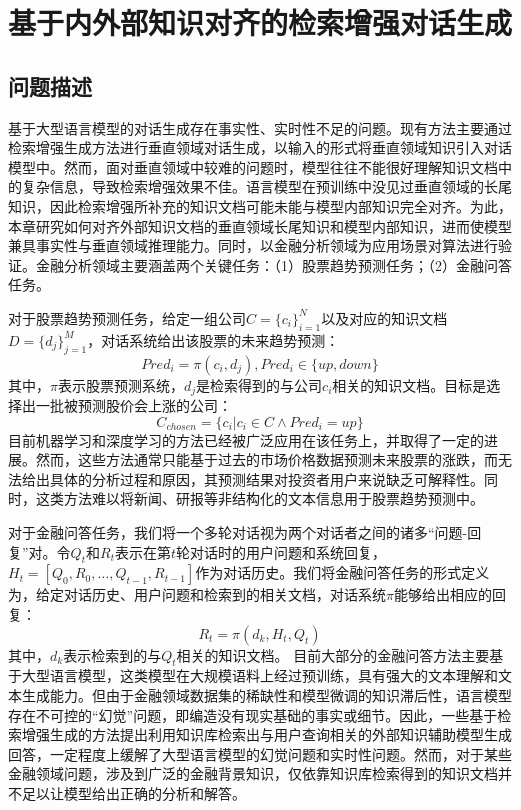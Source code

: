 \chapter{基于内外部知识对齐的检索增强对话生成}

\section{问题描述}

基于大型语言模型的对话生成存在事实性、实时性不足的问题。现有方法主要通过检索增强生成方法进行垂直领域对话生成，以输入的形式将垂直领域知识引入对话模型中。然而，面对垂直领域中较难的问题时，模型往往不能很好理解知识文档中的复杂信息，导致检索增强效果不佳。语言模型在预训练中没见过垂直领域的长尾知识，因此检索增强所补充的知识文档可能未能与模型内部知识完全对齐。为此，本章研究如何对齐外部知识文档的垂直领域长尾知识和模型内部知识，进而使模型兼具事实性与垂直领域推理能力。同时，以金融分析领域为应用场景对算法进行验证。金融分析领域主要涵盖两个关键任务：（1）股票趋势预测任务；（2）金融问答任务。

对于股票趋势预测任务，给定一组公司$C=\{c_i\}_{i=1}^N$以及对应的知识文档$D=\{d_j\}_{j=1}^M$，对话系统给出该股票的未来趋势预测：
\begin{equation}
	Pred_i=\pi(c_i, d_j), Pred_i \in \{up, down\}
\end{equation}
其中，$\pi$表示股票预测系统，$d_j$是检索得到的与公司$c_i$相关的知识文档。目标是选择出一批被预测股价会上涨的公司：
\begin{equation}
	C_{chosen} = \{c_i | c_i \in C \land Pred_i = up\}
\end{equation}
目前机器学习和深度学习的方法已经被广泛应用在该任务上，并取得了一定的进展。然而，这些方法通常只能基于过去的市场价格数据预测未来股票的涨跌，而无法给出具体的分析过程和原因，其预测结果对投资者用户来说缺乏可解释性。同时，这类方法难以将新闻、研报等非结构化的文本信息用于股票趋势预测中。

对于金融问答任务，我们将一个多轮对话视为两个对话者之间的诸多“问题-回复”对。令$Q_t$和$R_t$表示在第$t$轮对话时的用户问题和系统回复，$H_t=[Q_0, R_0, …, Q_{t-1}, R_{t-1}]$作为对话历史。我们将金融问答任务的形式定义为，给定对话历史、用户问题和检索到的相关文档，对话系统$\pi$能够给出相应的回复：
\begin{equation}
	R_t = \pi(d_k, H_t, Q_t)
\end{equation}
其中，$d_k$表示检索到的与$Q_t$相关的知识文档。
目前大部分的金融问答方法主要基于大型语言模型，这类模型在大规模语料上经过预训练，具有强大的文本理解和文本生成能力。但由于金融领域数据集的稀缺性和模型微调的知识滞后性，语言模型存在不可控的“幻觉”问题，即编造没有现实基础的事实或细节。因此，一些基于检索增强生成的方法提出利用知识库检索出与用户查询相关的外部知识辅助模型生成回答，一定程度上缓解了大型语言模型的幻觉问题和实时性问题。然而，对于某些金融领域问题，涉及到广泛的金融背景知识，仅依靠知识库检索得到的知识文档并不足以让模型给出正确的分析和解答。

